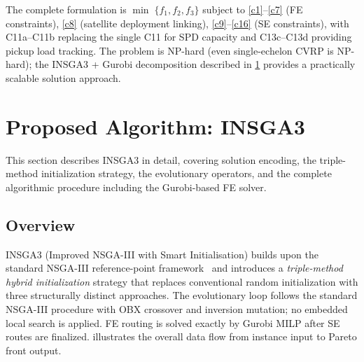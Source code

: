 \documentclass[11pt, a4paper]{article}
\numberwithin{equation}{section}
\begin{document}
The complete formulation is $\min\;\{f_1,f_2,f_3\}$ subject to
\cref{c1}--\cref{c7} (FE constraints), \cref{c8} (satellite deployment linking),
\cref{c9}--\cref{c16}
(SE constraints), with C11a--C11b replacing the single C11 for SPD capacity
and C13c--C13d providing pickup load tracking.  The problem is NP-hard (even
single-echelon CVRP is NP-hard); the INSGA3 + Gurobi decomposition
described in \cref{sec:alg} provides a practically scalable solution approach.

\section{Proposed Algorithm: INSGA3}
\label{sec:alg}

This section describes INSGA3 in detail, covering solution encoding,
the triple-method initialization strategy, the evolutionary operators,
and the complete algorithmic procedure including the Gurobi-based FE solver.

\subsection{Overview}

INSGA3 (Improved NSGA-III with Smart Initialisation) builds upon the
standard NSGA-III reference-point framework~\cite{deb2014nsga3} and
introduces a \emph{triple-method hybrid initialization} strategy that
replaces conventional random initialization with three structurally
distinct approaches.  The evolutionary loop follows the standard NSGA-III
procedure with OBX crossover and inversion mutation; no embedded local search
is applied.  FE routing is solved exactly by Gurobi MILP after SE routes are
finalized.   illustrates the overall data flow from
instance input to Pareto front output.
\end{document}
